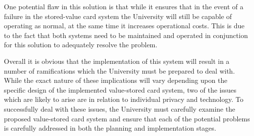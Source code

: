 One potential flaw in this solution is that while it ensures that in the event of a failure in the stored-value card system the University will still be capable of operating as normal, at the same time it increases operational costs. This is due to the fact that both systems need to be maintained and operated in conjunction for this solution to adequately resolve the problem.

Overall it is obvious that the implementation of this system will result in a number of ramifications which the University must be prepared to deal with. While the exact nature of these implications will vary depending upon the specific design of the implemented value-stored card system, two of the issues which are likely to arise are in relation to individual privacy and technology. To successfully deal with these issues, the University must carefully examine the proposed value-stored card system and ensure that each of the potential problems is carefully addressed in both the planning and implementation stages. 
